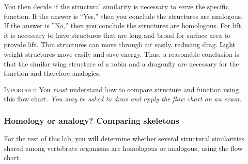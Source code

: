 \documentclass[12pt, hidelinks]{exam}
\begin{document}
You then decide if the structural similarity is necessary to serve the specific function. 
If the answer is “Yes,” then you conclude the structures are analogous. If the answer is
”No,” then you conclude the structures are homologous. For lift, it is necessary to have
structures that are long and broad for surface area to provide lift. Thin structures can
move through air easily, reducing drag. Light weight structures move easily and
save energy. Thus, a reasonable conclusion is that the similar wing structure of
a robin and a dragonfly are necessary for the function and therefore analogies.

\textsc{Important:} You \emph{must} understand how to compare structure and function
using this flow chart. \emph{You may be asked to draw and apply the flow chart on an exam.}

\subsubsection*{Homology or analogy? Comparing skeletons}

For the rest of this lab, you will determine whether several structural similarities
shared among vertebrate organisms are homologous or analogous, using the flow chart.
\end{document}
